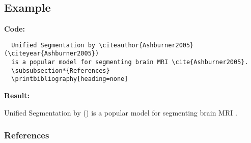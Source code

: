 \subsection{Example}
\textbf{Code:}
\par
\begin{lstlisting}
  Unified Segmentation by \citeauthor{Ashburner2005} (\citeyear{Ashburner2005})
  is a popular model for segmenting brain MRI \cite{Ashburner2005}.
  \subsubsection*{References}
  \printbibliography[heading=none]
\end{lstlisting}
\textbf{Result:}
\par
Unified Segmentation by \citeauthor{Ashburner2005} (\citeyear{Ashburner2005})
is a popular model for segmenting brain MRI \cite{Ashburner2005}.
\subsubsection*{References}
\printbibliography[heading=none]

